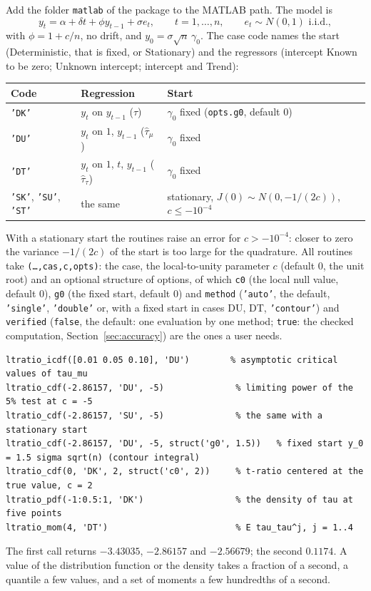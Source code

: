 \documentclass[11pt]{article}
\newcommand{\code}[1]{\texttt{#1}}
\newcommand{\Fu}{\textsf{DU}}
\newcommand{\Ft}{\textsf{DT}}
\begin{document}
Add the folder \code{matlab} of the package to the MATLAB path.  The model is
\[
y_t=\alpha+\delta t+\phi y_{t-1}+\sigma e_t,\qquad t=1,\ldots,n,\qquad e_t\sim N(0,1)\text{ i.i.d.},
\]
with $\phi=1+c/n$, no drift, and $y_0=\sigma\sqrt n\,\gamma_0$.  The case code names the start (\textsf{D}eterministic, that is fixed, or \textsf{S}tationary) and the regressors (intercept \textsf{K}nown to be zero; \textsf{U}nknown intercept; intercept and \textsf{T}rend):
\begin{center}
\begin{tabular}{@{}lll@{}}
\toprule
Code & Regression & Start\\
\midrule
\code{'DK'} & $y_t$ on $y_{t-1}$ ($\hat\tau$) & $\gamma_0$ fixed (\code{opts.g0}, default $0$)\\
\code{'DU'} & $y_t$ on $1$, $y_{t-1}$ ($\hat\tau_\mu$) & $\gamma_0$ fixed\\
\code{'DT'} & $y_t$ on $1$, $t$, $y_{t-1}$ ($\hat\tau_\tau$) & $\gamma_0$ fixed\\
\code{'SK'}, \code{'SU'}, \code{'ST'} & the same & stationary, $J(0)\sim N(0,-1/(2c))$, $c\le-10^{-4}$\\
\bottomrule
\end{tabular}
\end{center}
With a stationary start the routines raise an error for $c>-10^{-4}$: closer to zero the variance $-1/(2c)$ of the start is too large for the quadrature.
All routines take \code{(\ldots,cas,c,opts)}: the case, the local-to-unity parameter $c$ (default $0$, the unit root) and an optional structure of options, of which \code{c0} (the local null value, default $0$), \code{g0} (the fixed start, default $0$) and \code{method} (\code{'auto'}, the default, \code{'single'}, \code{'double'} or, with a fixed start in cases \Fu, \Ft, \code{'contour'}) and \code{verified} (\code{false}, the default: one evaluation by one method; \code{true}: the checked computation, Section~\ref{sec:accuracy}) are the ones a user needs.
\begin{lstlisting}
ltratio_icdf([0.01 0.05 0.10], 'DU')        % asymptotic critical values of tau_mu
ltratio_cdf(-2.86157, 'DU', -5)              % limiting power of the 5% test at c = -5
ltratio_cdf(-2.86157, 'SU', -5)              % the same with a stationary start
ltratio_cdf(-2.86157, 'DU', -5, struct('g0', 1.5))   % fixed start y_0 = 1.5 sigma sqrt(n) (contour integral)
ltratio_cdf(0, 'DK', 2, struct('c0', 2))     % t-ratio centered at the true value, c = 2
ltratio_pdf(-1:0.5:1, 'DK')                  % the density of tau at five points
ltratio_mom(4, 'DT')                         % E tau_tau^j, j = 1..4
\end{lstlisting}
The first call returns $-3.43035$, $-2.86157$ and $-2.56679$; the second $0.1174$.  A value of the distribution function or the density takes a fraction of a second, a quantile a few values, and a set of moments a few hundredths of a second.
\end{document}
